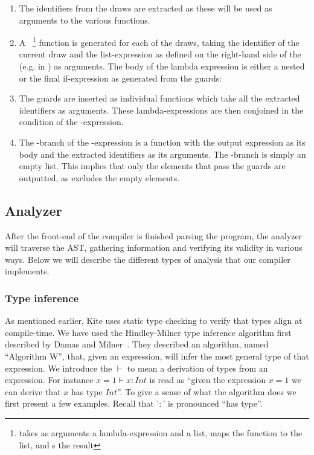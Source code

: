 \begin{enumerate}
\item The identifiers from the draws are extracted as these will be used as arguments to the various functions.

\item A ~\footnote{ takes as arguments a lambda-expression and a list, maps the function to the list, and s the result} function is generated for each of the draws, taking the identifier of the current draw and the list-expression as defined on the right-hand side of the \code{<-} (e.g. \code{[1, 2, 3]} in ) as arguments. The body of the lambda expression is either a nested  or the final if-expression as generated from the guards:

\item The guards are inserted as individual functions which take all the extracted identifiers as arguments. These lambda-expressions are then conjoined in the condition of the -expression.

\item The -branch of the -expression is a function with the output expression as its body and the extracted identifiers as its arguments. The -branch is simply an empty list. This implies that only the elements that pass the guards are outputted, as  excludes the empty elements.
\end{enumerate}


\subsection{Analyzer}
After the front-end of the compiler is finished parsing the program, the analyzer will traverse the AST, gathering information and verifying its validity in various ways. Below we will describe the different types of analysis that our compiler implements.

\subsubsection{Type inference}
As mentioned earlier, Kite uses static type checking to verify that types align at compile-time. We have used the Hindley-Milner type inference algorithm first described by Damas and Milner~\cite{milner82}. They described an algorithm, named ``Algorithm W'', that, given an expression, will infer the most general type of that expression. We introduce the $\vdash$ to mean a derivation of types from an expression. For instance $x = 1 \vdash x : Int$ is read as ``given the expression $x = 1$ we can derive that $x$ has type $Int$''. To give a sense of what the algorithm does we first present a few examples. Recall that '$:$' is pronounced ``has type''.

